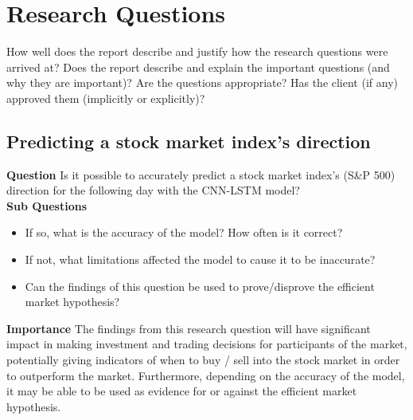 \chapter{Research Questions} \label{chap:research-questions}

How well does the report describe and justify how the research questions were arrived at?
Does the report describe and explain the important questions (and why they are important)?
Are the questions appropriate? Has the client (if any) approved them (implicitly or explicitly)?

\section{Predicting a stock market index's direction}
\textbf{Question} Is it possible to accurately predict a stock market index's (S\&P 500) direction for
the following day with the CNN-LSTM model?\\
\textbf{Sub Questions}
\begin{itemize}
    \item If so, what is the accuracy of the model? How often is it correct?
    \item If not, what limitations affected the model to cause it to be inaccurate?
    \item Can the findings of this question be used to prove/disprove the efficient market hypothesis?
\end{itemize}
\textbf{Importance} The findings from this research question will have significant impact in making
investment and trading decisions for participants of the market, potentially giving indicators of
when to buy / sell into the stock market in order to outperform the market. Furthermore, depending
on the accuracy of the model, it may be able to be used as evidence for or against the efficient
market hypothesis.

